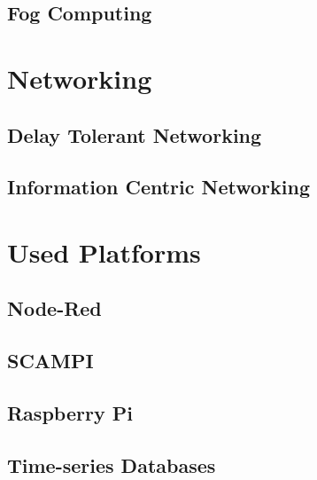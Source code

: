 \subsection{Fog Computing}



\section{Networking}
\subsection{Delay Tolerant Networking}
\subsection{Information Centric Networking}

\section{Used Platforms}
\subsection{Node-Red}
\subsection{SCAMPI}
\subsection{Raspberry Pi}
\subsection{Time-series Databases}


